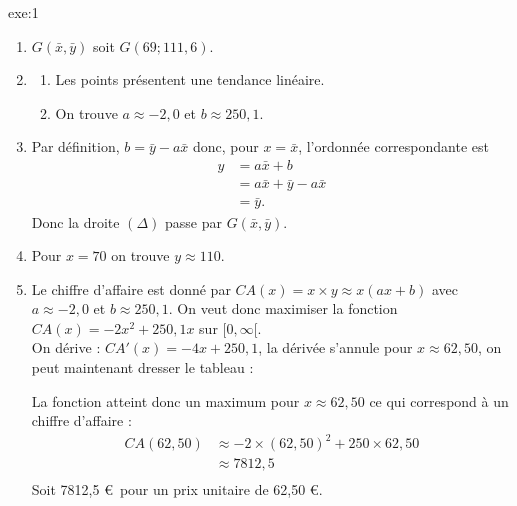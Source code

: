 {}{exe:1}{
\begin{enumerate}
  \item $G(\bar{x}, \bar{y})$ soit $G(69 ; 111,6)$.
  \item \begin{enumerate}
	 \item Les points présentent une tendance linéaire.
	 \item On trouve $a \approx -2,0$ et $b \approx 250,1$.
	\end{enumerate}
	\item Par définition, $b = \bar{y} - a \bar{x}$ donc, pour $x = \bar{x}$, l'ordonnée correspondante est 
	\begin{align*}
	y & = a \bar{x} + b \\
	& = a \bar{x} + \bar{y} - a \bar{x} \\
	& = \bar{y} .
	\end{align*}
	Donc la droite $(\Delta)$ passe par $G(\bar{x}, \bar{y})$.
	\item Pour $x = 70$ on trouve $y \approx 110$.
	\item Le chiffre d'affaire est donné par $CA(x) = x \times y \approx x(ax+b)$ avec $a \approx -2,0$ et $b \approx 250,1$.
	On veut donc maximiser la fonction $CA(x) = -2x^2 + 250,1 x$ sur $[0, \infty[$. \\
	On dérive : $CA'(x) = -4x + 250,1$, la dérivée s'annule pour $x \approx 62,50$, on peut maintenant dresser le tableau :

	\begin{center}
	\end{center}
	
	La fonction atteint donc un maximum pour $x \approx 62,50$ ce qui correspond à un chiffre d'affaire :
	\begin{align*}
	CA(62,50) & \approx -2 \times (62,50)^2 + 250 \times 62,50  \\
	& \approx 7812,5 \\
	\end{align*}
	Soit 7812,5 \euro~pour un prix unitaire de 62,50 \euro.
 \end{enumerate}
}

\newpage

